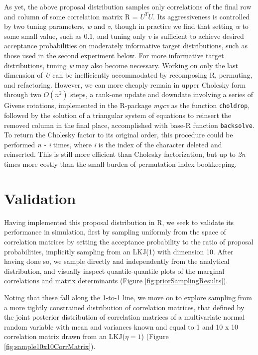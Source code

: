 \documentclass[10pt]{article}
\begin{document}
As yet, the above proposal distribution samples only correlations of the final row and column of some correlation matrix R = $U^{T}U$. Its aggressiveness is controlled by two tuning parameters, \textit{w} and \textit{v}, though in practice we find that setting \textit{w} to some small value, such as 0.1, and tuning only \textit{v} is sufficient to achieve desired acceptance probabilities on moderately informative target distributions, such as those used in the second experiment below. For more informative target distributions, tuning \textit{w} may also become necessary. Working on only the last dimension of \textit{U} can be inefficiently accommodated by recomposing R, permuting, and refactoring. However, we can more cheaply remain in upper Cholesky form through two $O(n^2)$ steps, a rank-one update and downdate involving a series of Givens rotations, implemented in the R-package \textit{mgcv} \citep{woodPackageMgcv2015} as the function \texttt{choldrop}, followed by the solution of a triangular system of equations to reinsert the removed column in the final place, accomplished with base-R \citep{rcoreteamLanguageEnvironmentStatistical2013} function \texttt{backsolve}. To return the Cholesky factor to its original order, this procedure could be performed \textit{n - i} times, where \textit{i} is the index of the character deleted and reinserted. This is still more efficient than Cholesky factorization, but up to \textit{2n} times more costly than the small burden of permutation index bookkeeping. 

\clearpage

\section{Validation}

Having implemented this proposal distribution in R, we seek to validate its performance in simulation, first by sampling uniformly from the space of correlation matrices by setting the acceptance probability to the ratio of proposal probabilities, implicitly sampling from an LKJ(1) with dimension 10. After having done so, we sample directly and independently from the analytical distribution, and visually inspect quantile-quantile plots of the marginal correlations and matrix determinants (Figure \ref{fig:priorSamplingResults}).

Noting that these fall along the 1-to-1 line, we move on to explore sampling from a more tightly constrained distribution of correlation matrices, that defined by the joint posterior distribution of correlation matrices of a multivariate normal random variable with mean and variances known and equal to 1 and 10 x 10 correlation matrix drawn from an LKJ($\eta = 1$) (Figure \ref{fig:sample10x10CorrMatrix}).
\end{document}
